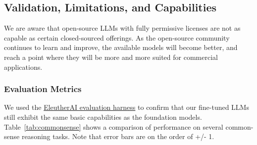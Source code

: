 \documentclass{article}
\begin{document}
\subsection{Validation, Limitations, and Capabilities}
We are aware that open-source LLMs with fully permissive licenses are not as capable as certain closed-sourced offerings. As the open-source community continues to learn and improve, the available models will become better, and reach a point where they will be more and more suited for commercial applications.

\subsubsection{Evaluation Metrics}
We used the \href{https://github.com/EleutherAI/lm-evaluation-harness}{EleutherAI evaluation harness} to confirm that our fine-tuned LLMs still exhibit the same basic capabilities as the foundation models. Table~\ref{tab:commonsense} shows a comparison of performance on several common-sense reasoning tasks. Note that error bars are on the order of +/- 1.
\end{document}
